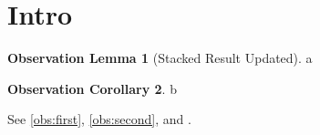 \documentclass{wrapper}
\begin{document}
\wrapperclass\articleclass\layoutmode\hypermode
\theoremstyle{definition}
\swapnumbers
\newtheorem{oblemma}{Observation Lemma}[section]
\newtheorem{obcor}[oblemma]{Observation Corollary}
\section{Intro}
\begin{oblemma}[Stacked Result Updated]\label{obs:first}
a
\end{oblemma}
\begin{obcor}\label{obs:second}
b
\end{obcor}
See \autoref{obs:first}, \autoref{obs:second}, and .
\end{document}
